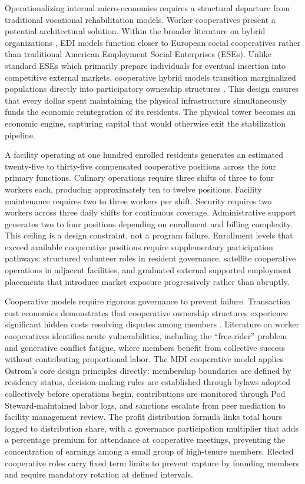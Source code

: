 \documentclass[12pt, letterpaper]{article}
\begin{document}
Operationalizing internal micro-economies requires a structural departure from traditional vocational rehabilitation models. Worker cooperatives present a potential architectural solution. Within the broader literature on hybrid organizations \cite{battilana2014advancing}, EDI models function closer to European social cooperatives \cite{defourny2010conceptions, galera2009social} rather than traditional American Employment Social Enterprises (ESEs). Unlike standard ESEs which primarily prepare individuals for eventual insertion into competitive external markets, cooperative hybrid models transition marginalized populations directly into participatory ownership structures \cite{perotin2014what}. This design ensures that every dollar spent maintaining the physical infrastructure simultaneously funds the economic reintegration of its residents. The physical tower becomes an economic engine, capturing capital that would otherwise exit the stabilization pipeline.

A facility operating at one hundred enrolled residents generates an estimated twenty-five to thirty-five compensated cooperative positions across the four primary functions. Culinary operations require three shifts of three to four workers each, producing approximately ten to twelve positions. Facility maintenance requires two to three workers per shift. Security requires two workers across three daily shifts for continuous coverage. Administrative support generates two to four positions depending on enrollment and billing complexity. This ceiling is a design constraint, not a program failure. Enrollment levels that exceed available cooperative positions require supplementary participation pathways: structured volunteer roles in resident governance, satellite cooperative operations in adjacent facilities, and graduated external supported employment placements that introduce market exposure progressively rather than abruptly.

Cooperative models require rigorous governance to prevent failure. Transaction cost economics demonstrates that cooperative ownership structures experience significant hidden costs resolving disputes among members \cite{hansmann1996ownership}. Literature on worker cooperatives identifies acute vulnerabilities, including the ``free-rider'' problem \cite{ostrom1990governing} and generative conflict fatigue, where members benefit from collective success without contributing proportional labor. The MDI cooperative model applies Ostrom's core design principles directly: membership boundaries are defined by residency status, decision-making rules are established through bylaws adopted collectively before operations begin, contributions are monitored through Pod Steward-maintained labor logs, and sanctions escalate from peer mediation to facility management review. The profit distribution formula links total hours logged to distribution share, with a governance participation multiplier that adds a percentage premium for attendance at cooperative meetings, preventing the concentration of earnings among a small group of high-tenure members. Elected cooperative roles carry fixed term limits to prevent capture by founding members and require mandatory rotation at defined intervals.
\end{document}
